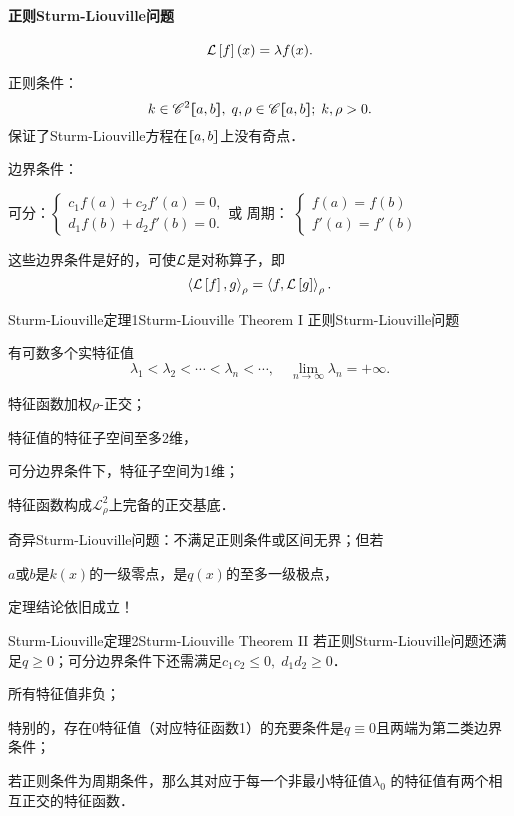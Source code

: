 \paragraph*{正则Sturm-Liouville问题}
\[\mathcal L\left[f\right](x)=\lambda f(x).\]

正则条件：
\[
	k\in\mathscr C^2\lfloor\hspace{-4.7 pt}\lceil a,b\rceil\hspace{-4.7 pt}\rfloor,\;q,\rho\in\mathscr C\lfloor\hspace{-4.7 pt}\lceil a,b\rceil\hspace{-4.7 pt}\rfloor;\;k,\rho>0.
\]
保证了Sturm-Liouville方程在$\lfloor\hspace{-4.7 pt}\lceil a,b\rceil\hspace{-4.7 pt}\rfloor$上没有奇点．

边界条件：
\begin{center}
	可分：$\begin{cases}
			c_1f(a)+c_2f'(a)=0, \\
			d_1f(b)+d_2f'(b)=0.
		\end{cases}$\quad 或 \quad 周期：
	$\begin{cases}
			f(a)=f(b) \\
			f'(a)=f'(b)
		\end{cases}$
\end{center}
这些边界条件是好的，可使$\mathcal L$是对称算子，即
\[\left\langle \mathcal L\left[f\right],g\right\rangle_\rho=\left\langle f,\mathcal L\left[g\right]\right\rangle_\rho.\]
\begin{theorem}{Sturm-Liouville定理1}{Sturm-Liouville Theorem I}
	正则Sturm-Liouville问题
	\begin{compactenum}
		\item 有可数多个实特征值
		      \[\lambda_1<\lambda_2<\cdots<\lambda_n<\cdots,\quad\lim_{n\to\infty}\lambda_n=+\infty.\]
		\item 特征函数加权$\rho$\;-\;正交；
		\item 特征值的特征子空间至多2维，

		      可分边界条件下，特征子空间为1维；
		\item 特征函数构成$\mathscr L_\rho^2$上完备的正交基底．
	\end{compactenum}
\end{theorem}
奇异Sturm-Liouville问题：不满足正则条件或区间无界；但若
\begin{center}
	$a$或$b$是$k(x)$的一级零点，是$q(x)$的至多一级极点， %
\end{center}
定理结论依旧成立！
\begin{theorem}{Sturm-Liouville定理2}{Sturm-Liouville Theorem II}
	若正则Sturm-Liouville问题还满足$q\geqslant 0$；可分边界条件下还需满足$c_1c_2\leqslant 0,\;d_1d_2\geqslant 0$．
	\begin{compactenum}
		\item 所有特征值非负；

		      特别的，存在0特征值（对应特征函数1）的充要条件是$q\equiv 0$且两端为第二类边界条件；
		\item 若正则条件为周期条件，那么其对应于每一个非最小特征值$\lambda_0$
		的特征值有两个相互正交的特征函数．
	\end{compactenum}
\end{theorem}
